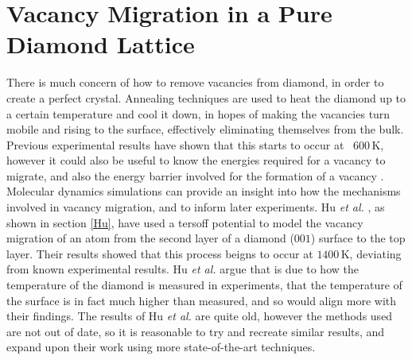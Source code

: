 \documentclass[10pt,a4paper,twocolumn,twoside]{extarticle}
\newcommand{\al}{\emph{et al. }}
\begin{document}



\section{Vacancy Migration in a Pure Diamond Lattice}

There is much concern of how to remove vacancies from diamond, in order to create a perfect crystal. Annealing techniques are used to heat the diamond up to a certain temperature and cool it down, in hopes of making the vacancies turn mobile and rising to the surface, effectively eliminating themselves from the bulk. Previous experimental results have shown that this starts to occur at ~$600$\,K, however it could also be useful to know the energies required for a vacancy to migrate, and also the energy barrier involved for the formation of a vacancy \cite{VacancyTemp}. Molecular dynamics simulations can provide an insight into how the mechanisms involved in vacancy migration, and to inform later experiments. Hu \al, as shown in section \ref{Hu}, have used a tersoff potential to model the vacancy migration of an atom from the second layer of a diamond ($001$) surface to the top layer. Their results showed that this process beigns to occur at $1400$\,K, deviating from known experimental results. Hu \al argue that is due to how the temperature of the diamond is measured in experiments, that the temperature of the surface is in fact much higher than measured, and so would align more with their findings. The results of Hu \al are quite old, however the methods used are not out of date, so it is reasonable to try and recreate similar results, and expand upon their work using more state-of-the-art techniques. 
\end{document}
